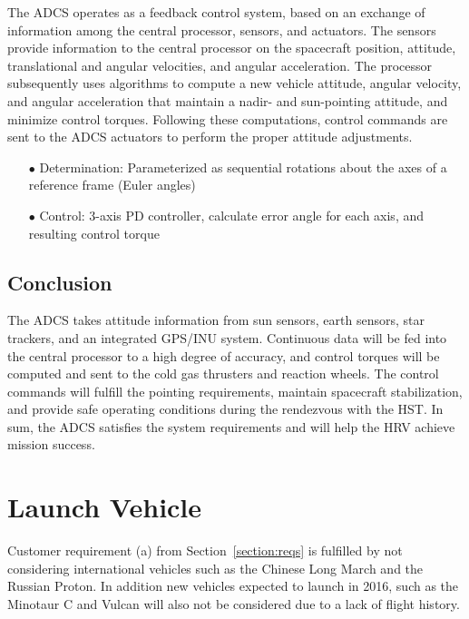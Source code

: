 \documentclass[paper=letter, fontsize=11pt]{scrartcl} %
\numberwithin{equation}{section} %
\numberwithin{figure}{section} %
\numberwithin{table}{section} %
\begin{document}
The ADCS operates as a feedback control system, based on an exchange of information among the central processor, sensors, and actuators. The sensors provide information to the central processor on the spacecraft position, attitude, translational and angular velocities, and angular acceleration. The processor subsequently uses algorithms to compute a new vehicle attitude, angular velocity, and angular acceleration that maintain a nadir- and sun-pointing attitude, and minimize control torques. Following these computations, control commands are sent to the ADCS actuators to perform the proper attitude adjustments.

\begin{enumerate}
    \item[$\bullet$] Determination: Parameterized as sequential rotations about the axes of a reference frame (Euler angles)
    \item[$\bullet$] Control: 3-axis PD controller, calculate error angle for each axis, and resulting control torque
\end{enumerate}

\subsection{Conclusion}
The ADCS takes attitude information from sun sensors, earth sensors, star trackers, and an integrated GPS/INU system. Continuous data will be fed into the central processor to a high degree of accuracy, and control torques will be computed and sent to the cold gas thrusters and reaction wheels. The control commands will fulfill the pointing requirements, maintain spacecraft stabilization, and provide safe operating conditions during the rendezvous with the HST. In sum, the ADCS satisfies the system requirements and will help the HRV achieve mission success.


\section{Launch Vehicle}

Customer requirement (a) from Section~\ref{section:reqs} is fulfilled by not considering international vehicles such as the Chinese Long March and the Russian Proton. In addition new vehicles expected to launch in 2016, such as the Minotaur C and Vulcan will also not be considered due to a lack of flight history.
\end{document}
